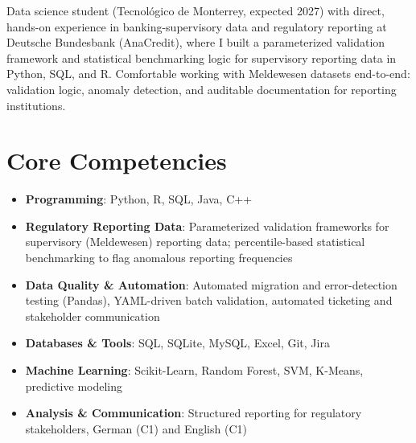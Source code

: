 \documentclass[11pt,a4paper,sans]{moderncv}
\begin{document}
\makecvtitle


\vspace{6pt}
\small{Data science student (Tecnológico de Monterrey, expected 2027) with direct, hands-on experience in banking-supervisory data and regulatory reporting at Deutsche Bundesbank (AnaCredit), where I built a parameterized validation framework and statistical benchmarking logic for supervisory reporting data in Python, SQL, and R. Comfortable working with Meldewesen datasets end-to-end: validation logic, anomaly detection, and auditable documentation for reporting institutions.}


\section{Core Competencies}
\vspace{1pt}
\begin{itemize}

\item \textbf{Programming}: Python, R, SQL, Java, C++

\item \textbf{Regulatory Reporting Data}: Parameterized validation frameworks for supervisory (Meldewesen) reporting data; percentile-based statistical benchmarking to flag anomalous reporting frequencies

\item \textbf{Data Quality \& Automation}: Automated migration and error-detection testing (Pandas), YAML-driven batch validation, automated ticketing and stakeholder communication

\item \textbf{Databases \& Tools}: SQL, SQLite, MySQL, Excel, Git, Jira

\item \textbf{Machine Learning}: Scikit-Learn, Random Forest, SVM, K-Means, predictive modeling

\item \textbf{Analysis \& Communication}: Structured reporting for regulatory stakeholders, German (C1) and English (C1)

\end{itemize}
\end{document}
